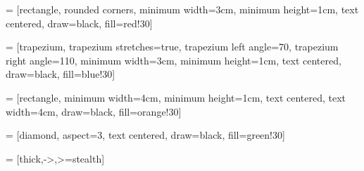\usetikzlibrary{shapes.geometric, arrows,
                calc,backgrounds, positioning}

 = [rectangle, rounded corners, 
  minimum width=3cm, 
  minimum height=1cm,
  text centered, 
  draw=black, 
  fill=red!30]

 = [trapezium, 
  trapezium stretches=true, %
  trapezium left angle=70, 
  trapezium right angle=110, 
  minimum width=3cm, 
  minimum height=1cm, text centered, 
  draw=black, fill=blue!30]

 = [rectangle, 
  minimum width=4cm, 
  minimum height=1cm, 
  text centered, 
  text width=4cm, 
  draw=black, 
  fill=orange!30]

 = [diamond, 
  aspect=3,
  text centered, 
  draw=black, 
  fill=green!30]

 = [thick,->,>=stealth]


